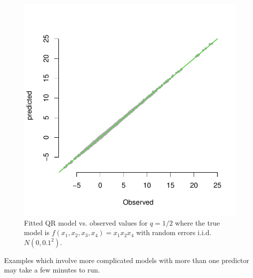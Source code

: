 \documentclass[a4paper,12pt]{article}
\begin{document}
\begin{figure}[b!]
\centering
\includegraphics[width=.6\linewidth]{Figures/multivariate04.pdf}
\caption{Fitted QR model vs. observed values for $q=1/2$ where the true model is $f(x_1, x_2, x_3, x_4)=x_1x_2x_4$ with random errors i.i.d. $N(0, 0.1^2)$.}\label{multivariate04}
\end{figure} 

Examples which involve more complicated models with more than one predictor may take a few minutes to run. 

% 
% 
% 
% 
\end{document}
